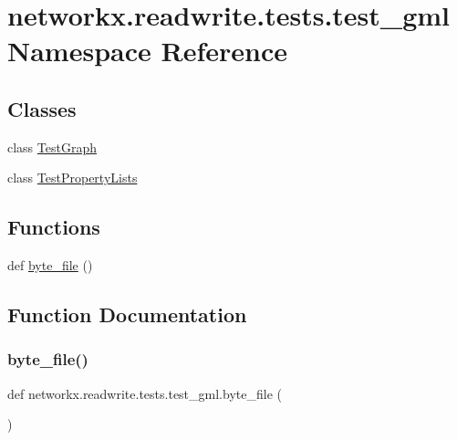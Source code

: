 \hypertarget{namespacenetworkx_1_1readwrite_1_1tests_1_1test__gml}{}\section{networkx.\+readwrite.\+tests.\+test\+\_\+gml Namespace Reference}
\label{namespacenetworkx_1_1readwrite_1_1tests_1_1test__gml}
\subsection*{Classes}
\begin{DoxyCompactItemize}
\item 
class \hyperlink{classnetworkx_1_1readwrite_1_1tests_1_1test__gml_1_1TestGraph}{Test\+Graph}
\item 
class \hyperlink{classnetworkx_1_1readwrite_1_1tests_1_1test__gml_1_1TestPropertyLists}{Test\+Property\+Lists}
\end{DoxyCompactItemize}
\subsection*{Functions}
\begin{DoxyCompactItemize}
\item 
def \hyperlink{namespacenetworkx_1_1readwrite_1_1tests_1_1test__gml_ac85cd833f2dd522273db54f52bea60a1}{byte\+\_\+file} ()
\end{DoxyCompactItemize}


\subsection{Function Documentation}
\mbox{\label{namespacenetworkx_1_1readwrite_1_1tests_1_1test__gml_ac85cd833f2dd522273db54f52bea60a1}} 
\subsubsection{\texorpdfstring{byte\+\_\+file()}{byte\_file()}}
{\footnotesize\ttfamily def networkx.\+readwrite.\+tests.\+test\+\_\+gml.\+byte\+\_\+file (\begin{DoxyParamCaption}{ }\end{DoxyParamCaption})}

